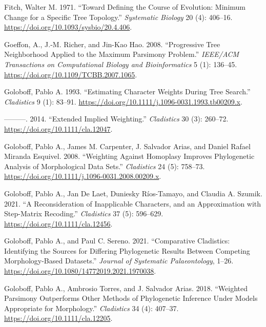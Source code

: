 \begin{CSLReferences}{1}{0}
\leavevmode{}%
Fitch, Walter M. 1971. {``Toward Defining the Course of Evolution: Minimum Change for a Specific Tree Topology.''} \emph{Systematic Biology} 20 (4): 406--16. \url{https://doi.org/10.1093/sysbio/20.4.406}.

\leavevmode{}%
Goeffon, A., J.-M. Richer, and Jin-Kao Hao. 2008. {``Progressive {Tree Neighborhood} Applied to the {Maximum Parsimony} Problem.''} \emph{IEEE/ACM Transactions on Computational Biology and Bioinformatics} 5 (1): 136--45. \url{https://doi.org/10.1109/TCBB.2007.1065}.

\leavevmode{}%
Goloboff, Pablo A. 1993. {``Estimating Character Weights During Tree Search.''} \emph{Cladistics} 9 (1): 83--91. \url{https://doi.org/10.1111/j.1096-0031.1993.tb00209.x}.

\leavevmode{}%
---------. 2014. {``Extended Implied Weighting.''} \emph{Cladistics} 30 (3): 260--72. \url{https://doi.org/10.1111/cla.12047}.

\leavevmode{}%
Goloboff, Pablo A., James M. Carpenter, J. Salvador Arias, and Daniel Rafael Miranda Esquivel. 2008. {``Weighting Against Homoplasy Improves Phylogenetic Analysis of Morphological Data Sets.''} \emph{Cladistics} 24 (5): 758--73. \url{https://doi.org/10.1111/j.1096-0031.2008.00209.x}.

\leavevmode{}%
Goloboff, Pablo A., Jan De Laet, Duniesky Ríos-Tamayo, and Claudia A. Szumik. 2021. {``A Reconsideration of Inapplicable Characters, and an Approximation with Step-Matrix Recoding.''} \emph{Cladistics} 37 (5): 596--629. \url{https://doi.org/10.1111/cla.12456}.

\leavevmode{}%
Goloboff, Pablo A., and Paul C. Sereno. 2021. {``Comparative Cladistics: Identifying the Sources for Differing Phylogenetic Results Between Competing Morphology-Based Datasets.''} \emph{Journal of Systematic Palaeontology}, 1--26. \url{https://doi.org/10.1080/14772019.2021.1970038}.

\leavevmode{}%
Goloboff, Pablo A., Ambrosio Torres, and J. Salvador Arias. 2018. {``Weighted Parsimony Outperforms Other Methods of Phylogenetic Inference Under Models Appropriate for Morphology.''} \emph{Cladistics} 34 (4): 407--37. \url{https://doi.org/10.1111/cla.12205}.


\end{CSLReferences}
